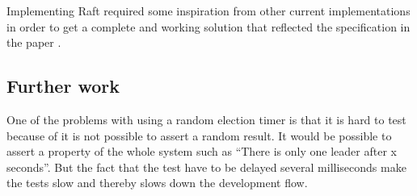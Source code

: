 Implementing Raft required some inspiration from other current implementations in order to get a complete and working solution that reflected the specification in the paper \cite{Raft}.

\subsection{Further work}

One of the problems with using a random election timer is that it is hard to test because of it is not possible to assert a random result. It would be possible to assert a property of the whole system such as ``There is only one leader after x seconds''. But the fact that the test have to be delayed several milliseconds make the tests slow and thereby slows down the development flow.


%

